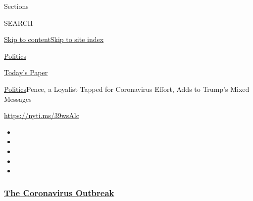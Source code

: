 Sections

SEARCH

\protect\hyperlink{site-content}{Skip to
content}\protect\hyperlink{site-index}{Skip to site index}

\href{https://www.nytimes3xbfgragh.onion/section/politics}{Politics}

\href{https://myaccount.nytimes3xbfgragh.onion/auth/login?response_type=cookie\&client_id=vi}{}

\href{https://www.nytimes3xbfgragh.onion/section/todayspaper}{Today's
Paper}

\href{/section/politics}{Politics}\textbar{}Pence, a Loyalist Tapped for
Coronavirus Effort, Adds to Trump's Mixed Messages

\url{https://nyti.ms/39wsAlc}

\begin{itemize}
\item
\item
\item
\item
\item
\end{itemize}

\hypertarget{the-coronavirus-outbreak}{%
\subsubsection{\texorpdfstring{\href{https://www.nytimes3xbfgragh.onion/news-event/coronavirus?name=styln-coronavirus-national\&region=TOP_BANNER\&variant=undefined\&block=storyline_menu_recirc\&action=click\&pgtype=Article\&impression_id=52e36e10-e38a-11ea-85cc-bf105b368d22}{The
Coronavirus
Outbreak}}{The Coronavirus Outbreak}}\label{the-coronavirus-outbreak}}


